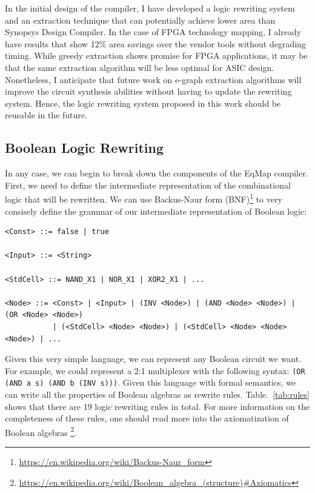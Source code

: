 \documentclass[10pt,letterpaper]{article}
\newcommand{\shortname}{EqMap}
\begin{document}
In the initial design of the compiler, I have developed a logic rewriting
system and an extraction technique that can potentially achieve lower area than
Synopsys Design Compiler. In the case of FPGA technology mapping, I already
have results that show 12\% area savings over the vendor tools without
degrading timing. While greedy extraction shows promise for FPGA applications,
it may be that the same extraction algorithm will be less optimal for ASIC
design. Nonetheless, I anticipate that future work on e-graph extraction
algorithms will improve the circuit synthesis abilities without having to
update the rewriting system. Hence, the logic rewriting system proposed in this
work should be reusable in the future.

\subsection{Boolean Logic Rewriting}\label{sec:baseline:rewriting}
In any case, we can begin to break down the components of the \shortname{}
compiler. First, we need to define the intermediate representation of the
combinational logic that will be rewritten. We can use Backus-Naur form
(BNF)\footnote{\href{https://en.wikipedia.org/wiki/Backus\%E2\%80\%93Naur\_form}{https://en.wikipedia.org/wiki/Backus-Naur\_form}}
to very consisely define the grammar of our intermediate representation of
Boolean logic:

\begin{verbatim}
<Const> ::= false | true

<Input> ::= <String>

<StdCell> ::= NAND_X1 | NOR_X1 | XOR2_X1 | ...

<Node> ::= <Const> | <Input> | (INV <Node>) | (AND <Node> <Node>) | (OR <Node> <Node>)
           | (<StdCell> <Node> <Node>) | (<StdCell> <Node> <Node> <Node>) | ...
\end{verbatim}

Given this very simple language, we can represent any Boolean circuit we want.
For example, we could represent a 2:1 multiplexer with the following syntax:
\texttt{(OR (AND a s) (AND b (INV s)))}. Given this language with formal
semantics, we can write all the properties of Boolean algebras as rewrite
rules. Table.~\ref{tab:rules} shows that there are 19 logic rewriting rules in
total. For more information on the completeness of these rules, one should read
more into the axiomatization of Boolean algebras
\footnote{\href{https://en.wikipedia.org/wiki/Boolean\_algebra\_(structure)\#Axiomatics}{https://en.wikipedia.org/wiki/Boolean\_algebra\_(structure)\#Axiomatics}}.
\end{document}
